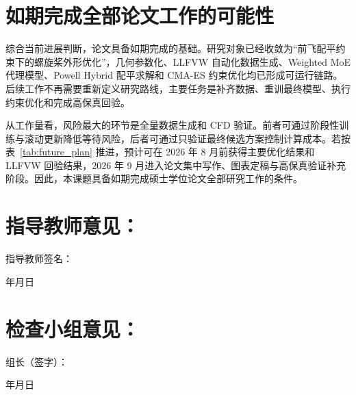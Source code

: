 \section{如期完成全部论文工作的可能性}

综合当前进展判断，论文具备如期完成的基础。研究对象已经收敛为“前飞配平约束下的螺旋桨外形优化”，几何参数化、LLFVW 自动化数据生成、Weighted MoE 代理模型、Powell Hybrid 配平求解和 CMA-ES 约束优化均已形成可运行链路。后续工作不再需要重新定义研究路线，主要任务是补齐数据、重训最终模型、执行约束优化和完成高保真回验。

从工作量看，风险最大的环节是全量数据生成和 CFD 验证。前者可通过阶段性训练与滚动更新降低等待风险，后者可通过只验证最终候选方案控制计算成本。若按表~\ref{tab:future_plan} 推进，预计可在 2026 年 8 月前获得主要优化结果和 LLFVW 回验结果，2026 年 9 月进入论文集中写作、图表定稿与高保真验证补充阶段。因此，本课题具备如期完成硕士学位论文全部研究工作的条件。

\section*{指导教师意见：}

\vspace{6\baselineskip}

\hfill 指导教师签名：\hspace{8\ccwd}

\vspace{24bp}
\hfill 年\hspace{2\ccwd}月\hspace{2\ccwd}日

\section*{检查小组意见：}

\vspace{6\baselineskip}

\hfill 组长（签字）：\hspace{8\ccwd}

\vspace{24bp}
\hfill 年\hspace{2\ccwd}月\hspace{2\ccwd}日
